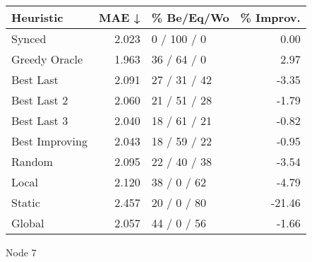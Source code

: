 \begin{tabular}{lrlr}
\toprule
\textbf{Heuristic} & \textbf{MAE ↓} & \textbf{\% Be/Eq/Wo} & \textbf{\% Improv.} \\
\midrule
            Synced &          2.023 &          0 / 100 / 0 &                0.00 \\
     Greedy Oracle &          1.963 &          36 / 64 / 0 &                2.97 \\
         Best Last &          2.091 &         27 / 31 / 42 &               -3.35 \\
       Best Last 2 &          2.060 &         21 / 51 / 28 &               -1.79 \\
       Best Last 3 &          2.040 &         18 / 61 / 21 &               -0.82 \\
    Best Improving &          2.043 &         18 / 59 / 22 &               -0.95 \\
            Random &          2.095 &         22 / 40 / 38 &               -3.54 \\
             Local &          2.120 &          38 / 0 / 62 &               -4.79 \\
            Static &          2.457 &          20 / 0 / 80 &              -21.46 \\
            Global &          2.057 &          44 / 0 / 56 &               -1.66 \\
\bottomrule
\end{tabular}
\caption{Node 7}
\label{tab:hr_non_lr05_le1_bs2_7}
